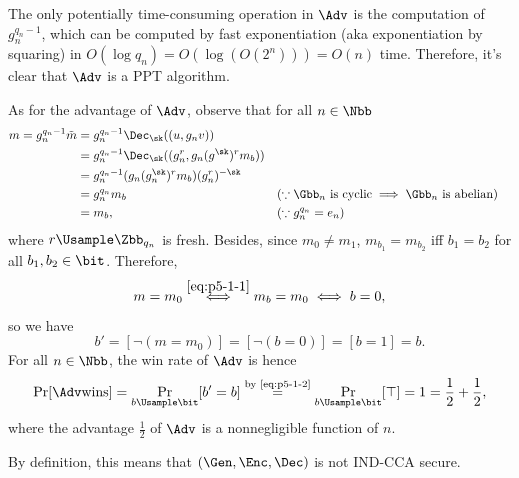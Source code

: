 \begin{answer}[i]
    The only potentially time-consuming operation in $\Adv$ is the computation of $g_n^{q_n-1}$, which can be computed by fast exponentiation (aka exponentiation by squaring) in $O(\log q_n)=O(\log (O(2^n)))=O(n)$ time. Therefore, it's clear that $\Adv$ is a PPT algorithm. 

    As for the advantage of $\Adv$, observe that for all $n\in\Nbb$
    \begin{align}\label{eq:p5-1-1}
        m=g_n^{q_n-1}\tilde{m}
        &=g_n^{q_n-1} \Dec_\sk((u, g_n v))\notag\\
        &= g_n^{q_n-1} \Dec_\sk((g_n^r, g_n (g^\sk)^r m_b))\notag\\
        &= g_n^{q_n-1} (g_n (g_n^\sk)^r m_b) (g_n^r)^{-\sk}\notag\\
        &= g_n^{q_n} m_b  && (\because \Gbb_n \textrm{ is cyclic} \implies \Gbb_n \textrm{ is abelian}) \notag\\
        &= m_b, && (\because g_n^{q_n} = e_n)
    \end{align}
    where $r\Usample\Zbb_{q_n}$ is fresh.
    Besides, since $m_0\neq m_1$, $m_{b_1}=m_{b_2}$ iff $b_1=b_2$ for all $b_1,b_2\in\bit$.
    Therefore,
    \[
        m=m_0 \stackrel{\eqref{eq:p5-1-1}}\iff m_b=m_0\iff b=0,
    \]
    so we have
    \begin{equation}\label{eq:p5-1-2}
        b' = [\neg(m=m_0)]= [\neg (b=0)] = [b=1] =b.
    \end{equation}
    For all $n\in\Nbb$, the win rate of $\Adv$ is hence
    \[
        \Pr[\Adv \textrm{wins}]=  \Pr_{b\Usample\bit}[b' =b] \stackrel{\textrm{by \eqref{eq:p5-1-2}}}= \Pr_{b\Usample\bit}[\top]  = 1 = \frac{1}{2}+\frac{1}{2},
    \]
    where the advantage $\frac{1}{2}$ of $\Adv$ is a nonnegligible function of $n$.

    By definition, this means that $(\Gen, \Enc, \Dec)$ is not IND-CCA secure.
\end{answer}






